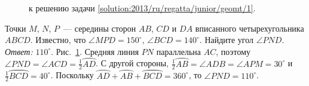 \ifsolution
\begin{figure}\centering
    \caption{к решению задачи \ref{solution:2013/ru/regatta/junior/geomt/1}.}
    \label{fig:solution:2013/ru/regatta/junior/geomt/1}
\end{figure}
\fi %


\problem
Точки $M$, $N$, $P$~--- середины сторон $AB$, $CD$ и $DA$ вписанного
четырехугольника $ABCD$.
Известно, что $\angle MPD = 150^\circ$, $\angle BCD = 140^\circ$.
Найдите угол $\angle PND$. 
\solution%
\label{solution:2013/ru/regatta/junior/geomt/1}%
\emph{Ответ:} $110^\circ$.
Рис.~\ref{fig:solution:2013/ru/regatta/junior/geomt/1}.
Средняя линия $PN$ параллельна $AC$, поэтому
$\angle PND = \angle ACD = \frac{1}{2} \wideparen{AD}$.
С другой стороны,
$\frac{1}{2} \wideparen{AB} = \angle ADB = \angle APM = 30^\circ$
и $\frac{1}{2} \wideparen{BCD} = 40^\circ$.
Поскольку
$\wideparen{AD} + \wideparen{AB} + \wideparen{BCD} = 360^\circ$,
то $\angle PND = 110^\circ$.
\endproblem
